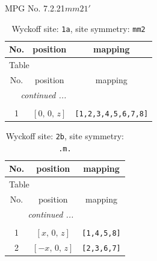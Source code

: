 \documentclass[fleqn,8pt]{jsarticle}
\begin{document}
\setcounter{MaxMatrixCols}{32}

\renewcommand{\tablename}{Table~}
\renewcommand{\figurename}{Figure~}
\begin{center}
\LARGE
MPG No. 7.2.21\quad$mm21'$
\end{center}
\renewcommand{\arraystretch}{1.2}
\begin{longtable}{ccc}
\caption{Wyckoff site: {\tt 1a}, site symmetry: {\tt mm2}}
 \\
 \hline \hline
No. & position & mapping \\ \hline \endfirsthead

\multicolumn{2}{l}{\tablename\ \thetable{}} \\
 \hline \hline
No. & position & mapping \\ \hline \endhead

 \hline \hline
\multicolumn{2}{r}{\footnotesize\it continued ...} \\ \endfoot

 \hline \hline
\multicolumn{2}{r}{} \\ \endlastfoot

1 & $\left[ 0,\, 0,\, z \right]$ & {\tt [1,2,3,4,5,6,7,8]} \\
\end{longtable}
\renewcommand{\arraystretch}{1.2}
\begin{longtable}{ccc}
\caption{Wyckoff site: {\tt 2b}, site symmetry: {\tt .m.}}
 \\
 \hline \hline
No. & position & mapping \\ \hline \endfirsthead

\multicolumn{2}{l}{\tablename\ \thetable{}} \\
 \hline \hline
No. & position & mapping \\ \hline \endhead

 \hline \hline
\multicolumn{2}{r}{\footnotesize\it continued ...} \\ \endfoot

 \hline \hline
\multicolumn{2}{r}{} \\ \endlastfoot

1 & $\left[ x,\, 0,\, z \right]$ & {\tt [1,4,5,8]} \\ \hline
2 & $\left[ - x,\, 0,\, z \right]$ & {\tt [2,3,6,7]} \\
\end{longtable}
\renewcommand{\arraystretch}{1.2}
\end{document}
